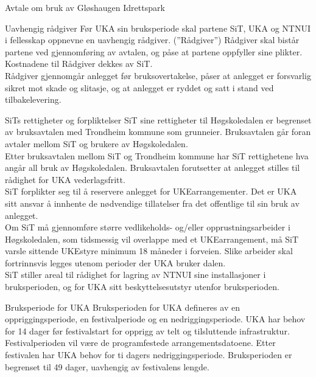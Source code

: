\begin{instruks*}{Avtale om bruk av Gløshaugen Idrettspark}
\begin{instruksledd}{Uavhengig rådgiver}
Før UKA sin bruksperiode skal partene SiT, UKA og NTNUI i fellesskap oppnevne en uavhengig rådgiver. (”Rådgiver”)  Rådgiver skal bistår partene ved gjennomføring av avtalen, og påse at partene oppfyller sine plikter. Kostnadene til Rådgiver dekkes av SiT.\\  

Rådgiver gjennomgår anlegget før bruksovertakelse, påser at anlegget er forsvarlig sikret mot skade og slitasje, og at anlegget er ryddet og satt i stand ved tilbakelevering.\\
\end{instruksledd}
 
\begin{instruksledd}{SiTs rettigheter og forpliktelser}
SiT sine rettigheter til Høgskoledalen er begrenset av bruksavtalen med Trondheim kommune som grunneier. Bruksavtalen går foran avtaler mellom SiT og brukere av Høgskoledalen.\\

Etter bruksavtalen mellom SiT og Trondheim kommune har SiT rettighetene hva angår all bruk av Høgskoledalen. Bruksavtalen forutsetter at anlegget stilles til rådighet for UKA vederlagsfritt.\\

SiT forplikter seg til å reservere anlegget for UKEarrangementer. Det er UKA sitt ansvar å innhente de nødvendige tillatelser fra det offentlige til sin bruk av anlegget.\\

Om SiT må gjennomføre større vedlikeholds- og/eller opprustningsarbeider i Høgskoledalen, som tidsmessig vil overlappe med et UKEarrangement, må SiT varsle sittende UKEstyre minimum 18 måneder i forveien. Slike arbeider skal fortrinnsvis legges utenom perioder der UKA bruker dalen.\\

SiT stiller areal til rådighet for lagring av NTNUI sine installasjoner i bruksperioden, og for UKA sitt beskyttelsesutstyr utenfor bruksperioden.\\
\end{instruksledd}

\begin{instruksledd}{Bruksperiode for UKA}
Bruksperioden for UKA defineres av en oppriggingsperiode, en festivalperiode og en nedriggingsperiode. UKA har behov for 14 dager før festivalstart for opprigg av telt og tilsluttende infrastruktur. Festivalperioden vil være de programfestede arrangementsdatoene. Etter festivalen har UKA behov for ti dagers nedriggingsperiode.  Bruksperioden er begrenset til 49 dager, uavhengig av festivalens lengde.\\


\end{instruksledd}
\end{instruks*}

